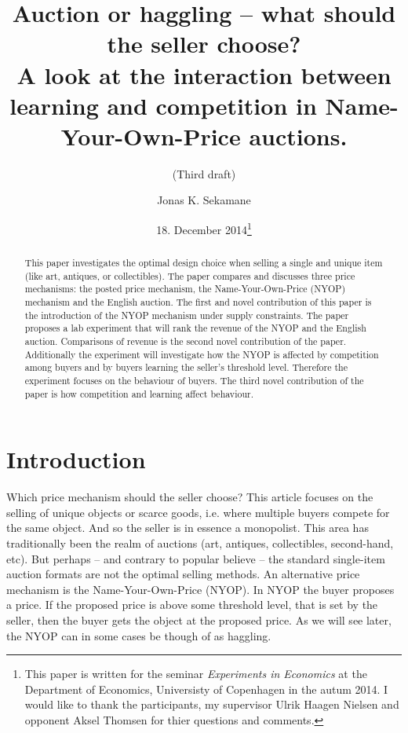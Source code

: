 \documentclass[a4paper,12pt]{article}
\title{\Large {\bf Auction or haggling -- what should the seller choose?} \\ A look at the interaction between learning and competition in Name-Your-Own-Price auctions.}
\subtitle{(Third draft)}
\author{Jonas K. Sekamane}
\date{18. December 2014\thanks{This paper is written for the seminar \emph{Experiments in Economics} at the Department of Economics, Universisty of Copenhagen in the autum 2014. I would like to thank the participants, my supervisor Ulrik Haagen Nielsen and opponent Aksel Thomsen for thier questions and comments.}}
\begin{document}
	
	\clearpage
	\thispagestyle{empty}
	
	\maketitle{}
		
	\newpage
	
	\clearpage %
	\setcounter{page}{1}
	
	\begin{abstract}
		{This paper investigates the optimal design choice when selling a single and unique item (like art, antiques, or collectibles). The paper compares and discusses three price mechanisms: the posted price mechanism, the Name-Your-Own-Price (NYOP) mechanism and the English auction. The first and novel contribution of this paper is the introduction of the NYOP mechanism under supply constraints. The paper proposes a lab experiment that will rank the revenue of the NYOP and the English auction. Comparisons of revenue is the second novel contribution of the paper. Additionally the experiment will investigate how the NYOP is affected by competition among buyers and by buyers learning the seller's threshold level. Therefore the experiment focuses on the behaviour of buyers. The third novel contribution of the paper is how competition and learning affect behaviour.}
	\end{abstract}
	
	

	\section{Introduction}

	Which price mechanism should the seller choose? This article focuses on the selling of unique objects or scarce goods, i.e. where multiple buyers compete for the same object. And so the seller is in essence a monopolist. This area has traditionally been the realm of auctions (art, antiques, collectibles, second-hand, etc). But perhaps -- and contrary to popular believe -- the standard single-item auction formats are not the optimal selling methods. An alternative price mechanism is the Name-Your-Own-Price (NYOP). In NYOP the buyer proposes a price. If the proposed price is above some threshold level, that is set by the seller, then the buyer gets the object at the proposed price. As we will see later, the NYOP can in some cases be though of as haggling.
	
\end{document}
